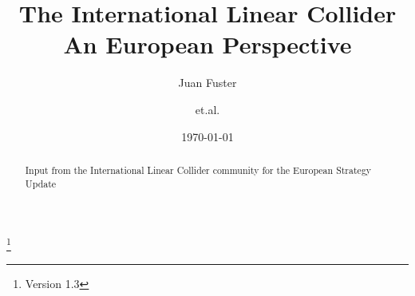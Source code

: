 \documentclass[%
 reprint,
 amsmath,amssymb,
 aps,
]{revtex4-1}
\begin{document}

\title{The International Linear Collider\\ An European Perspective}%
\thanks{Version 1.3}%

\author{Juan Fuster}
\author{et.al.}%
%


\date{\today}%

\begin{abstract}
Input from the International Linear Collider community for the European Strategy Update

\end{abstract}

\maketitle

\end{document}
